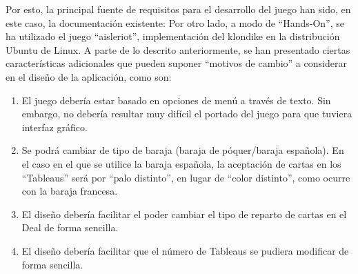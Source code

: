 \documentclass[11pt]{article}
\begin{document}
Por esto, la principal fuente de requisitos para el desarrollo del juego han sido, en este caso, la documentación existente:
Por otro lado, a modo de ``Hands-On'', se ha utilizado el juego ``aisleriot'', implementación del klondike en la distribución Ubuntu de Linux.
A parte de lo descrito anteriormente, se han presentado ciertas características adicionales que pueden suponer ``motivos de cambio'' a considerar en el diseño de la aplicación, como son:

\begin{enumerate}\itemsep0pt
\item{El juego debería estar basado en opciones de menú a través de texto}. Sin embargo, no debería resultar muy difícil el portado del juego para que tuviera interfaz gráfico.
\item{Se podrá cambiar de tipo de baraja (baraja de póquer/baraja española)}. En el caso en el que se utilice la baraja española, la aceptación de cartas en los ``Tableaus'' será por ``palo distinto'', en lugar de ``color distinto'', como ocurre con la baraja francesa.
\item{El diseño debería facilitar el poder cambiar el tipo de reparto de cartas en el Deal de forma sencilla}.
\item{El diseño debería facilitar que el número de Tableaus se pudiera modificar de forma sencilla}.
\end{enumerate}
\end{document}
